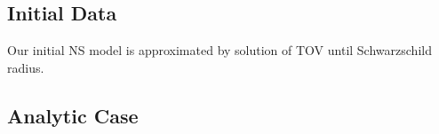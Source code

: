 \documentclass[prd]{revtex4}
\begin{document}

\subsection{Initial Data}
Our initial NS model is approximated by solution of TOV until Schwarzschild radius.

\subsection{Analytic Case}
\end{document}
